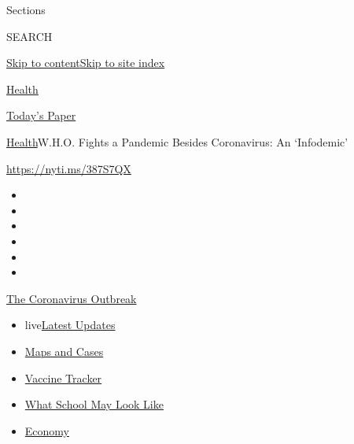 Sections

SEARCH

\protect\hyperlink{site-content}{Skip to
content}\protect\hyperlink{site-index}{Skip to site index}

\href{https://www.nytimes3xbfgragh.onion/section/health}{Health}

\href{https://myaccount.nytimes3xbfgragh.onion/auth/login?response_type=cookie\&client_id=vi}{}

\href{https://www.nytimes3xbfgragh.onion/section/todayspaper}{Today's
Paper}

\href{/section/health}{Health}\textbar{}W.H.O. Fights a Pandemic Besides
Coronavirus: An `Infodemic'

\url{https://nyti.ms/387S7QX}

\begin{itemize}
\item
\item
\item
\item
\item
\item
\end{itemize}

\href{https://www.nytimes3xbfgragh.onion/news-event/coronavirus?action=click\&pgtype=Article\&state=default\&region=TOP_BANNER\&context=storylines_menu}{The
Coronavirus Outbreak}

\begin{itemize}
\tightlist
\item
  live\href{https://www.nytimes3xbfgragh.onion/2020/08/01/world/coronavirus-covid-19.html?action=click\&pgtype=Article\&state=default\&region=TOP_BANNER\&context=storylines_menu}{Latest
  Updates}
\item
  \href{https://www.nytimes3xbfgragh.onion/interactive/2020/us/coronavirus-us-cases.html?action=click\&pgtype=Article\&state=default\&region=TOP_BANNER\&context=storylines_menu}{Maps
  and Cases}
\item
  \href{https://www.nytimes3xbfgragh.onion/interactive/2020/science/coronavirus-vaccine-tracker.html?action=click\&pgtype=Article\&state=default\&region=TOP_BANNER\&context=storylines_menu}{Vaccine
  Tracker}
\item
  \href{https://www.nytimes3xbfgragh.onion/interactive/2020/07/29/us/schools-reopening-coronavirus.html?action=click\&pgtype=Article\&state=default\&region=TOP_BANNER\&context=storylines_menu}{What
  School May Look Like}
\item
  \href{https://www.nytimes3xbfgragh.onion/live/2020/07/31/business/stock-market-today-coronavirus?action=click\&pgtype=Article\&state=default\&region=TOP_BANNER\&context=storylines_menu}{Economy}
\end{itemize}

